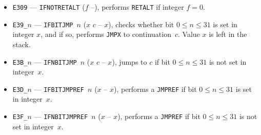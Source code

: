 \documentclass[12pt,oneside]{article}
\begin{document}
\begin{itemize}
\item {\tt E309} --- {\tt IFNOTRETALT} ($f$ --), performs {\tt RETALT} if integer $f=0$.
\item {\tt E39\_$n$} --- {\tt IFBITJMP $n$} ($x$ $c$ -- $x$), checks whether bit $0\leq n\leq 31$ is set in integer $x$, and if so, performs {\tt JMPX} to continuation~$c$. Value $x$ is left in the stack.
\item {\tt E3B\_$n$} --- {\tt IFNBITJMP $n$} ($x$ $c$ -- $x$), jumps to $c$ if bit $0\leq n\leq 31$ is not set in integer~$x$.
\item {\tt E3D\_$n$} --- {\tt IFBITJMPREF $n$} ($x$ -- $x$), performs a {\tt JMPREF} if bit $0\leq n\leq 31$ is set in integer~$x$.
\item {\tt E3F\_$n$} --- {\tt IFNBITJMPREF $n$} ($x$ -- $x$), performs a {\tt JMPREF} if bit $0\leq n\leq 31$ is not set in integer~$x$.
\end{itemize}
\end{document}
